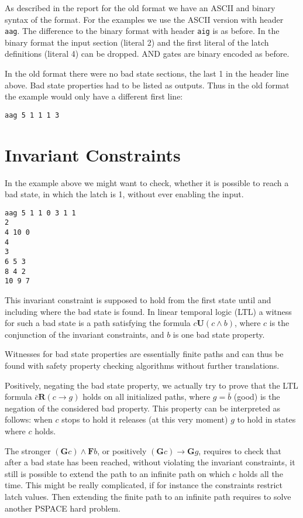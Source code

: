 \documentclass{llncs}
\begin{document}
As described in the report for the old format we have an ASCII and binary
syntax of the format.
For the examples we use the ASCII
version with header \texttt{aag}.  The difference to the binary format
with header \texttt{aig} is as before.  In the binary format
the input section (literal 2) and the first literal of the latch definitions
(literal 4) can be dropped.  AND gates are binary encoded as before.

In the old format there were no bad state sections, the last 1 in the header
line above.  Bad state properties had to be listed as outputs.  Thus in the old
format the example would only have a different first line: {\small
\begin{verbatim}
aag 5 1 1 1 3
\end{verbatim}}

\section{Invariant Constraints}

In the example above we might want to check, whether it is possible to reach
a bad state, in which the latch is 1, without ever enabling the input.
{\small
\begin{verbatim}
aag 5 1 1 0 3 1 1
2
4 10 0
4
3
6 5 3
8 4 2
10 9 7
\end{verbatim}}
This invariant constraint is supposed to hold from the first state
until and including where the bad state is found.  In linear temporal logic
(LTL) a witness for such a bad state is a path satisfying the formula
$\mathit{c} \mathrel{\mathbf{U}} (c \wedge b)$,
where $c$ is the conjunction of the invariant constraints, and $b$ is
one bad state property.  

Witnesses for bad state properties are essentially finite paths
and can thus be found with safety property checking algorithms without
further translations.

Positively, negating the bad state property, we actually try to prove that
the LTL formula $ \mathit{\bar c} \mathrel{\mathbf{R}} (c \to g) $ holds on
all initialized paths, where $g = \bar b$ (good) is the negation of the
considered bad property.  This property can be interpreted as follows: when
$c$ stops to hold it releases (at this very moment) $g$ to hold in states
where $c$ holds.

The stronger ${(\mathrel{\mathbf{G}} c)} \wedge {\mathrel{\mathbf{F}}b}$,
or positively ${(\mathrel{\mathbf{G}} c)} \to {\mathrel{\mathbf{G}}g}$,
requires to check that after a bad state has been
reached, without violating the invariant constraints, it still is possible
to extend the path to an infinite path on which $c$ holds all the time.
This might be really complicated, if for instance the constraints restrict
latch values.  Then extending the finite path to an infinite path requires
to solve another PSPACE hard problem.
\end{document}
